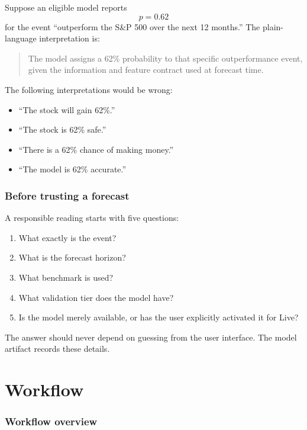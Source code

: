 \documentclass[11pt]{article}
\begin{document}
Suppose an eligible model reports
\begin{equation}
p=0.62
\end{equation}
for the event ``outperform the S\&P 500 over the next 12 months.'' The plain-language interpretation is:

\begin{quote}
The model assigns a 62\% probability to that specific outperformance event, given the information and feature contract used at forecast time.
\end{quote}

The following interpretations would be wrong:

\begin{itemize}
\item ``The stock will gain 62\%.''
\item ``The stock is 62\% safe.''
\item ``There is a 62\% chance of making money.''
\item ``The model is 62\% accurate.''
\end{itemize}

\section{Before trusting a forecast}

A responsible reading starts with five questions:

\begin{enumerate}
\item What exactly is the event?
\item What is the forecast horizon?
\item What benchmark is used?
\item What validation tier does the model have?
\item Is the model merely available, or has the user explicitly activated it for Live?
\end{enumerate}

The answer should never depend on guessing from the user interface. The model artifact records these details.

\part{Workflow}

\section{Workflow overview}
\end{document}
